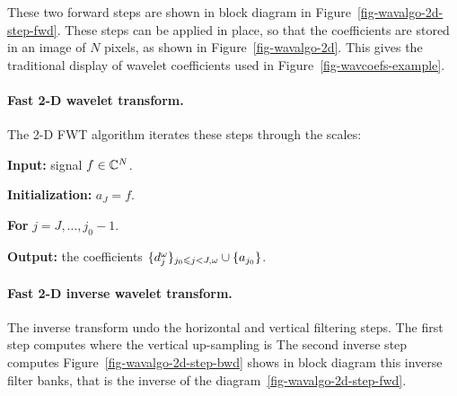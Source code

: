 These two forward steps are shown in block diagram in Figure~\ref{fig-wavalgo-2d-step-fwd}. 
These steps can be applied in place, so that the coefficients are stored in an image of $N$ pixels, as shown in Figure~\ref{fig-wavalgo-2d}. This gives the traditional display of wavelet coefficients used in Figure~\ref{fig-wavcoefs-example}.

\paragraph{Fast 2-D wavelet transform.}

The 2-D FWT algorithm iterates these steps through the scales:
\begin{rs}
	\item \textbf{Input:} signal $f \in \mathbb{C}^N$.
	\item \textbf{Initialization:} $a_J = f$.
	\item \textbf{For} $j=J,\ldots,j_0-1$.
	\item \textbf{Output:} the coefficients $\{ d_j^\omega \}_{j_0 \leqslant j < J, \omega} \cup \{ a_{j_0} \}$.
\end{rs}


\paragraph{Fast 2-D inverse wavelet transform.}

The inverse transform undo the horizontal and vertical filtering steps. 
The first step computes
where the vertical up-sampling is
The second inverse step computes
Figure~\ref{fig-wavalgo-2d-step-bwd} shows in block diagram this inverse filter banks, that is the inverse of the diagram~\ref{fig-wavalgo-2d-step-fwd}.


